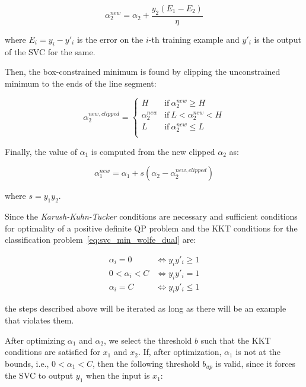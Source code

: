 \begin{equation} \label{eq:smo_svc_a2_new}
	\alpha_2^{new} = \alpha_2 + \frac{y_2(E_1 - E_2)}{\eta}
\end{equation}

where $E_i = y_i - y'_i$ is the error on the $i$-th training example and $y'_i$ is the output of the SVC for the same.

Then, the box-constrained minimum is found by clipping the unconstrained minimum to the ends of the line segment:

\begin{equation} \label{eq:smo_svc_a2_new_clipped}
    \alpha_2^{new,clipped} =
        \begin{cases}
            H & \text{if} \ \alpha_2^{new} \geq H \\
            \alpha_2^{new} & \text{if} \ L < \alpha_2^{new} < H \\
            L & \text{if} \ \alpha_2^{new} \leq L \\
        \end{cases}
\end{equation}

Finally, the value of $\alpha_1$ is computed from the new clipped $\alpha_2$ as:

\begin{equation} \label{eq:smo_svc_a1_new}
	\alpha_1^{new} = \alpha_1 + s (\alpha_2 - \alpha_2^{new,clipped})
\end{equation}

where $s = y_1 y_2$.

Since the \emph{Karush-Kuhn-Tucker} conditions are necessary and sufficient conditions for optimality of a positive definite QP problem and the KKT conditions for the classification problem~\eqref{eq:svc_min_wolfe_dual} are:

\begin{equation} \label{eq:svc_smo_kkt}
	\begin{aligned}
		\alpha_i = 0 & \Leftrightarrow y_i y'_i \geq 1 \\
		0 < \alpha_i < C & \Leftrightarrow y_i y'_i = 1 \\
		\alpha_i = C & \Leftrightarrow y_i y'_i \leq 1
	\end{aligned}
\end{equation}

the steps described above will be iterated as long as there will be an example that violates them.

After optimizing $\alpha_1$ and $\alpha_2$, we select the threshold $b$ such that the KKT conditions are satisfied for $x_1$ and $x_2$. If, after optimization, $\alpha_1$ is not at the bounds, i.e., $0 < \alpha_1 < C$, then the following threshold $b_{up}$ is valid, since it forces the SVC to output $y_1$ when the input is $x_1$:

